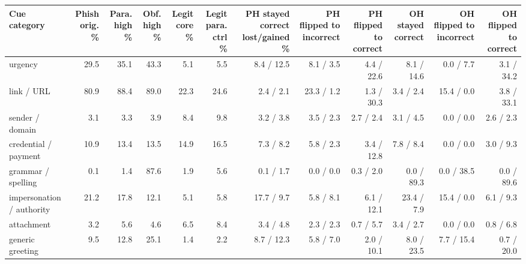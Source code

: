 \begin{tabular}{lrrrrrrrrrrr}
\toprule
Cue category & Phish orig. \% & Para. high \% & Obf. high \% & Legit core \% & Legit para. ctrl \% & PH stayed correct lost/gained \% & PH flipped to incorrect & PH flipped to correct & OH stayed correct & OH flipped to incorrect & OH flipped to correct \\
\midrule
urgency & 29.5 & 35.1 & 43.3 & 5.1 & 5.5 & 8.4 / 12.5 & 8.1 / 3.5 & 4.4 / 22.6 & 8.1 / 14.6 & 0.0 / 7.7 & 3.1 / 34.2 \\
link / URL & 80.9 & 88.4 & 89.0 & 22.3 & 24.6 & 2.4 / 2.1 & 23.3 / 1.2 & 1.3 / 30.3 & 3.4 / 2.4 & 15.4 / 0.0 & 3.8 / 33.1 \\
sender / domain & 3.1 & 3.3 & 3.9 & 8.4 & 9.8 & 3.2 / 3.8 & 3.5 / 2.3 & 2.7 / 2.4 & 3.1 / 4.5 & 0.0 / 0.0 & 2.6 / 2.3 \\
credential / payment & 10.9 & 13.4 & 13.5 & 14.9 & 16.5 & 7.3 / 8.2 & 5.8 / 2.3 & 3.4 / 12.8 & 7.8 / 8.4 & 0.0 / 0.0 & 3.0 / 9.3 \\
grammar / spelling & 0.1 & 1.4 & 87.6 & 1.9 & 5.6 & 0.1 / 1.7 & 0.0 / 0.0 & 0.3 / 2.0 & 0.0 / 89.3 & 0.0 / 38.5 & 0.0 / 89.6 \\
impersonation / authority & 21.2 & 17.8 & 12.1 & 5.1 & 5.8 & 17.7 / 9.7 & 5.8 / 8.1 & 6.1 / 12.1 & 23.4 / 7.9 & 15.4 / 0.0 & 6.1 / 9.3 \\
attachment & 3.2 & 5.6 & 4.6 & 6.5 & 8.4 & 3.4 / 4.8 & 2.3 / 2.3 & 0.7 / 5.7 & 3.4 / 2.7 & 0.0 / 0.0 & 0.8 / 6.8 \\
generic greeting & 9.5 & 12.8 & 25.1 & 1.4 & 2.2 & 8.7 / 12.3 & 5.8 / 7.0 & 2.0 / 10.1 & 8.0 / 23.5 & 7.7 / 15.4 & 0.7 / 20.0 \\
\bottomrule
\end{tabular}

